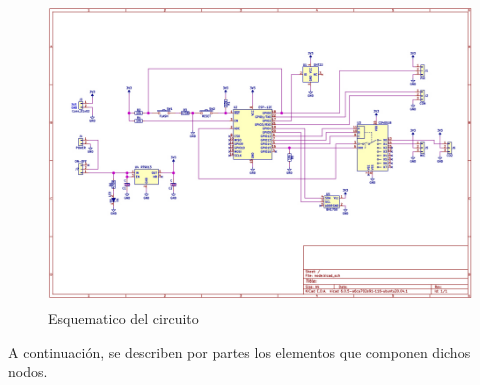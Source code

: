 \begin{figure}[H]
    \centering
    \includegraphics[width=12cm, height=8cm]{imagenes/esquematico nodo.jpg}
    \caption{Esquematico del circuito}
    \label{imag:esquematico_nodo}
\end{figure}

A continuación, se describen por partes los elementos que componen dichos nodos. \\


    
    



